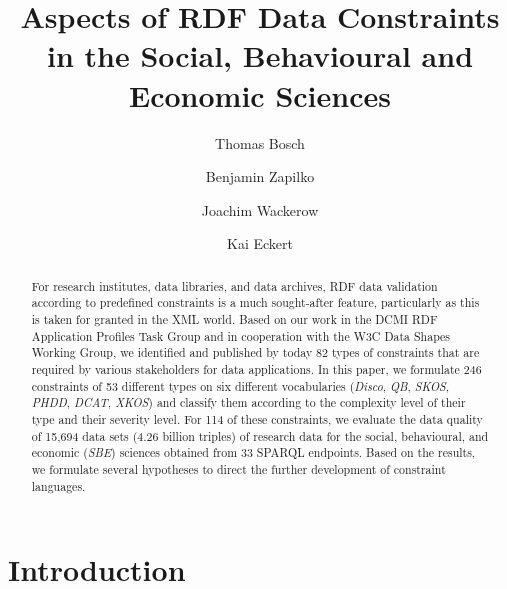 \documentclass{llncs}
\begin{document}
\renewcommand{\arraystretch}{1.3}
\title{Aspects of RDF Data Constraints in the Social, Behavioural and Economic Sciences}
\subtitle{}

%
\author{Thomas Bosch \and Benjamin Zapilko \and Joachim Wackerow \and Kai Eckert}
%
\authorrunning{} %
%

\maketitle              %

\begin{abstract}

For research institutes, data libraries, and data archives,
RDF data validation according to predefined constraints is a much sought-after feature, 
particularly as this is taken for granted in the XML world.
Based on our work in the DCMI RDF Application Profiles Task Group and in cooperation with the W3C Data Shapes Working Group, we identified and published by today 82 types of constraints that are required by various stakeholders for data applications.
In this paper, we formulate 246 constraints of 53 different types on six different vocabularies (\emph{Disco}, \emph{QB}, \emph{SKOS}, \emph{PHDD}, \emph{DCAT}, \emph{XKOS}) and classify them according to the complexity level of their type and their severity level. For 114 of these constraints, we evaluate the data quality of 15,694 data sets (4.26 billion triples) of research data for the social, behavioural, and economic (\emph{SBE}) sciences obtained from 33 SPARQL endpoints.
Based on the results, we formulate several hypotheses to direct the further development of constraint languages.


\end{abstract}

\section{Introduction}
\end{document}
